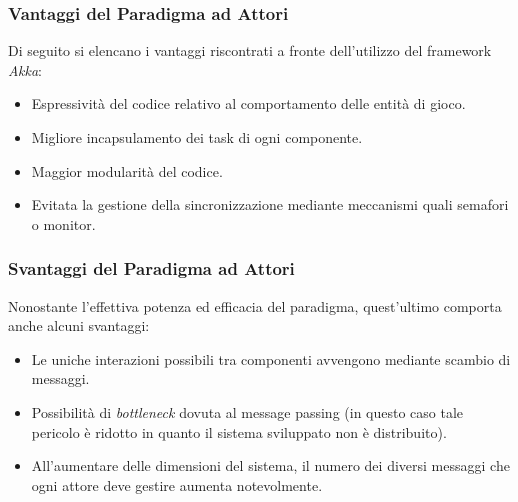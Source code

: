 \subsubsection{Vantaggi del Paradigma ad Attori}
Di seguito si elencano i vantaggi riscontrati a fronte dell'utilizzo del framework \textit{Akka}:
\begin{itemize}
    \item Espressività del codice relativo al comportamento delle entità di gioco.
    \item Migliore incapsulamento dei task di ogni componente.
    \item Maggior modularità del codice.
    \item Evitata la gestione della sincronizzazione mediante meccanismi quali semafori o monitor.
\end{itemize}

\subsubsection{Svantaggi del Paradigma ad Attori}
Nonostante l'effettiva potenza ed efficacia del paradigma, quest'ultimo comporta anche alcuni svantaggi:
\begin{itemize}
    \item Le uniche interazioni possibili tra componenti avvengono mediante scambio di messaggi.
    \item Possibilità di \textit{bottleneck} dovuta al message passing (in questo caso tale pericolo è ridotto in quanto il sistema sviluppato non è distribuito).
    \item All'aumentare delle dimensioni del sistema, il numero dei diversi messaggi che ogni attore deve gestire aumenta notevolmente.
\end{itemize}

